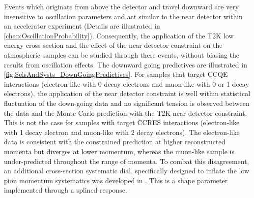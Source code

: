 Events which originate from above the detector and travel downward are very insensitive to oscillation parameters and act similar to the near detector within an accelerator experiment (Details are illustrated in \autoref{chap:OscillationProbability}). Consequently, the application of the T2K low energy cross section and the effect of the near detector constraint on the atmospheric samples can be studied through these events, without biasing the results from oscillation effects. The downward going predictives are illustrated in \autoref{fig:SelsAndSysts_DownGoingPredictives}. For samples that target CCQE interactions (electron-like with 0 decay electrons and muon-like with 0 or 1 decay electrons), the application of the near detector constraint is well within statistical fluctuation of the down-going data and no significant tension is observed between the data and the Monte Carlo prediction with the T2K near detector constraint. This is not the case for samples with target CCRES interactions (electron-like with 1 decay electron and muon-like with 2 decay electrons). The electron-like data is consistent with the constrained prediction at higher reconstructed momenta but diverges at lower momentum, whereas the muon-like sample is under-predicted throughout the range of momenta. To combat this disagreement, an additional cross-section systematic dial, specifically designed to inflate the low pion momentum systematics was developed in \cite{t2k_tn_422}. This is a shape parameter implemented through a splined response.

